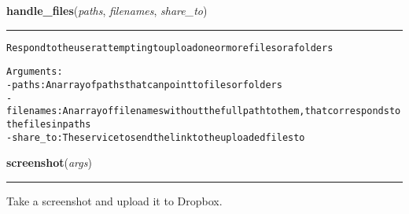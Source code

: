     \label{lib:main:handle_files}

    \vspace{0.5ex}

\hspace{.8\funcindent}\begin{boxedminipage}{\funcwidth}

    \raggedright \textbf{handle\_files}(\textit{paths}, \textit{filenames}, \textit{share\_to})

    \vspace{-1.5ex}

    \rule{\textwidth}{0.5\fboxrule}
\setlength{\parskip}{2ex}
\begin{alltt}

Respond to the user attempting to upload one or more files or a folders

Arguments:
- paths: An array of paths that can point to files or folders
- filenames: An array of filenames without the full path to them, that corresponds to the files in paths
- share\_to: The service to send the link to the uploaded files to
\end{alltt}

\setlength{\parskip}{1ex}
    \end{boxedminipage}

    \label{lib:main:screenshot}

    \vspace{0.5ex}

\hspace{.8\funcindent}\begin{boxedminipage}{\funcwidth}

    \raggedright \textbf{screenshot}(\textit{args})

    \vspace{-1.5ex}

    \rule{\textwidth}{0.5\fboxrule}
\setlength{\parskip}{2ex}
    Take a screenshot and upload it to Dropbox.

\setlength{\parskip}{1ex}
    \end{boxedminipage}

    \label{lib:main:upload}

    \vspace{0.5ex}

